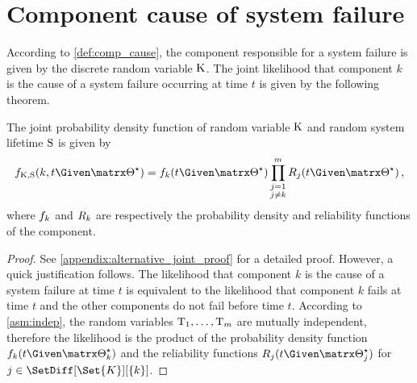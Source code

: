 \documentclass[../main.tex]{subfiles}
\begin{document}
\section{Component cause of system failure}
\label{sec:joint_dist}
According to \cref{def:comp_cause}, the component responsible for a system failure is given by the discrete random variable $\mathrm{K}$. The joint likelihood that component $k$ is the cause of a system failure occurring at time $t$ is given by the following theorem.
\begin{theorem}
\label{thm:general_joint_density}
The joint probability density function of random variable $\mathrm{K}$ and random system lifetime $\mathrm{S}$ is given by
\begin{equation}
\label{eq:general_joint_density}
    \pdf_{\RV{K}, \sv}(k, t \Given \tparam{\sysparam}) = \pdf_k(t \Given \tparam\sysparam) \prod_{\substack{j=1\\j \neq k}}^{m} \srv_j(t \Given \tparam\sysparam)\,,
\end{equation}
where $f_k$ and $R_k$ are respectively the probability density and 
reliability functions of the \kth component.
\end{theorem}
\begin{proof}
See \cref{appendix:alternative_joint_proof} for a detailed proof. However, a 
quick justification follows. The likelihood that component $k$ is the cause of 
a system failure at time $t$ is equivalent to the likelihood that component $k$ 
fails at time $t$ and the other components do not fail before time $t$. 
According to \cref{asm:indep}, the random variables $\mathrm{T}_1, \ldots, \mathrm{T}_m$ are 
mutually independent, therefore the likelihood is the product of the 
probability density function $\pdf_k(t \Given \tparam{\sysparam}_k)$ and the 
reliability functions $\srv_j(t \Given \tparam{\sysparam}_j)$ for $j \in 
\SetDiff[\Set{K}][\{ k \}]$.
\end{proof}
\end{document}
